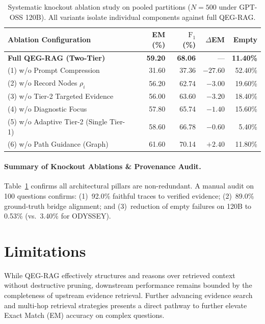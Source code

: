 \documentclass[runningheads]{llncs}
\begin{document}
\enlargethispage{6.0\baselineskip}
\begin{table}[t]
\vspace{-2mm}
\caption{Systematic knockout ablation study on pooled partitions ($N=500$ under GPT-OSS 120B). All variants isolate individual components against full QEG-RAG.}
\label{tab:ablation}
\centering
\scriptsize
\renewcommand{\arraystretch}{0.88}
\setlength{\tabcolsep}{6pt}
\begin{tabular}{@{}lrrrr@{}}
\toprule
Ablation Configuration & EM (\%) & $\text{F}_1$ (\%) & $\Delta$EM & Empty \\
\midrule
\textbf{Full QEG-RAG (Two-Tier)} & \textbf{59.20} & \textbf{68.06} & --- & \textbf{11.40\%} \\
\midrule
(1) w/o Prompt Compression       & 31.60 & 37.36 & $-27.60$ & 52.40\% \\
(2) w/o Record Nodes $\rho_i$    & 56.20 & 62.74 & $-3.00$  & 19.60\% \\
(3) w/o Tier-2 Targeted Evidence & 56.00 & 63.60 & $-3.20$  & 18.40\% \\
(4) w/o Diagnostic Focus         & 57.80 & 65.74 & $-1.40$  & 15.60\% \\
(5) w/o Adaptive Tier-2 (Single Tier-1) & 58.60 & 66.78 & $-0.60$  & 5.40\% \\
(6) w/o Path Guidance (Graph)    & 61.60 & 70.14 & $+2.40$  & 11.80\% \\
\bottomrule
\end{tabular}
\vspace{-2.5mm}
\end{table}

\paragraph{Summary of Knockout Ablations \& Provenance Audit.}
Table~\ref{tab:ablation} confirms all architectural pillars are non-redundant. A manual audit on 100 questions confirms: (1)~92.0\% faithful traces to verified evidence; (2)~89.0\% ground-truth bridge alignment; and (3)~reduction of empty failures on 120B to 0.53\% (vs.\ 3.40\% for ODYSSEY).

\section{Limitations}
\label{sec:limitations}
While QEG-RAG effectively structures and reasons over retrieved context without destructive pruning, downstream performance remains bounded by the completeness of upstream evidence retrieval. Further advancing evidence search and multi-hop retrieval strategies presents a direct pathway to further elevate Exact Match (EM) accuracy on complex questions.
\end{document}
